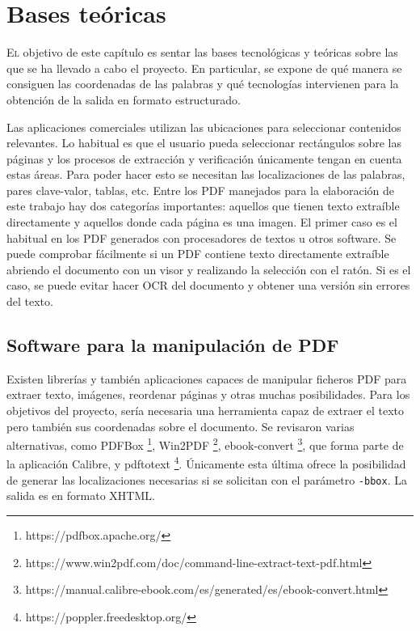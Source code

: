 
\chapter{Bases teóricas}
\label{chap:bases-teoricas}

\lettrine{E}l objetivo de este capítulo es sentar las bases tecnológicas y teóricas sobre las que se ha llevado a cabo el proyecto. En particular, se expone de qué manera se consiguen las coordenadas de las palabras y qué tecnologías intervienen para la obtención de la salida en formato estructurado.

Las aplicaciones comerciales utilizan las ubicaciones para seleccionar contenidos relevantes. Lo habitual es que el usuario pueda seleccionar rectángulos sobre las páginas y los procesos de extracción y verificación únicamente tengan en cuenta estas áreas. Para poder hacer esto se necesitan las localizaciones de las palabras, pares clave-valor, tablas, etc. Entre los PDF manejados para la elaboración de este trabajo hay dos categorías importantes: aquellos que tienen texto extraíble directamente y aquellos donde cada página es una imagen. El primer caso es el habitual en los PDF generados con procesadores de textos u otros software. Se puede comprobar fácilmente si un PDF contiene texto directamente extraíble abriendo el documento con un visor y realizando la selección con el ratón. Si es el caso, se puede evitar hacer OCR del documento y obtener una versión sin errores del texto.

\section{Software para la manipulación de PDF}

Existen librerías y también aplicaciones capaces de manipular ficheros PDF para extraer texto, imágenes, reordenar páginas y otras muchas posibilidades. Para los objetivos del proyecto, sería necesaria una herramienta capaz de extraer el texto pero también sus coordenadas sobre el documento. Se revisaron varias alternativas, como PDFBox \footnote{https://pdfbox.apache.org/}, Win2PDF \footnote{https://www.win2pdf.com/doc/command-line-extract-text-pdf.html}, ebook-convert \footnote{https://manual.calibre-ebook.com/es/generated/es/ebook-convert.html}, que forma parte de la aplicación Calibre, y pdftotext \footnote{https://poppler.freedesktop.org/}. Únicamente esta última ofrece la posibilidad de generar las localizaciones necesarias si se solicitan con el parámetro \verb|-bbox|. La salida es en formato XHTML.

